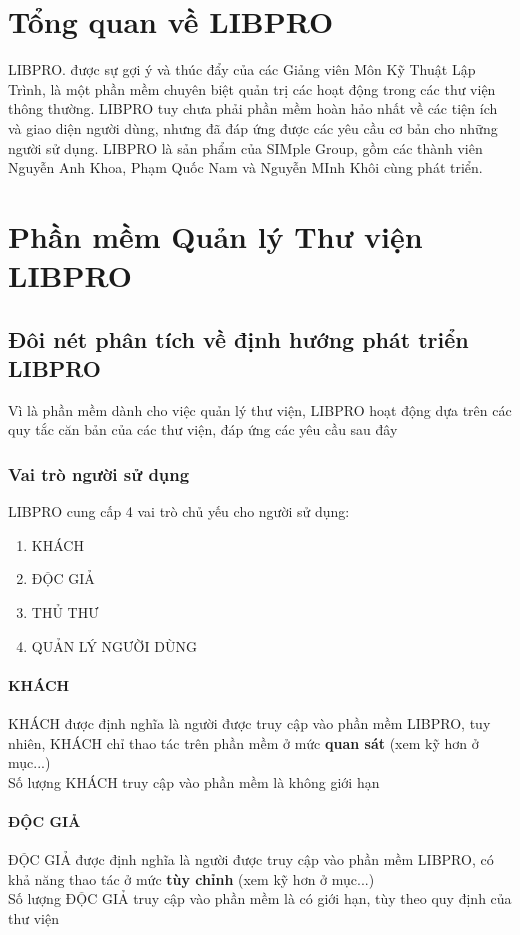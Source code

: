 \documentclass[12pt,a4paper]{report}
\begin{document}
\chapter{Tổng quan về LIBPRO}
LIBPRO. được sự gợi ý và thúc đẩy của các Giảng viên Môn Kỹ Thuật Lập Trình, là một phần mềm chuyên biệt quản trị các hoạt động trong các thư viện thông thường. LIBPRO tuy chưa phải phần mềm hoàn hảo nhất về các tiện ích và giao diện người dùng, nhưng đã đáp ứng được các yêu cầu cơ bản cho những người sử dụng. LIBPRO là sản phẩm của SIMple Group, gồm các thành viên Nguyễn Anh Khoa, Phạm Quốc Nam và Nguyễn MInh Khôi cùng phát triển.
\chapter{Phần mềm Quản lý Thư viện LIBPRO}
	\section{Đôi nét phân tích về định hướng phát triển LIBPRO}
	Vì là phần mềm dành cho việc quản lý thư viện, LIBPRO hoạt động dựa trên các quy tắc căn bản của các thư viện, đáp ứng các yêu cầu sau đây
		\subsection{Vai trò người sử dụng}
		LIBPRO cung cấp 4 vai trò chủ yếu cho người sử dụng:
		\begin{enumerate}
			\item KHÁCH
			\item ĐỘC GIẢ
			\item THỦ THƯ
			\item QUẢN LÝ NGƯỜI DÙNG
		\end{enumerate}
			\subsubsection{KHÁCH}
				KHÁCH được định nghĩa là người được truy cập vào phần mềm LIBPRO, tuy nhiên, KHÁCH chỉ thao tác trên phần mềm ở mức \textbf{quan sát} (xem kỹ hơn ở mục...)\\
				Số lượng KHÁCH truy cập vào phần mềm là không giới hạn
			\subsubsection{ĐỘC GIẢ}
				ĐỘC GIẢ được định nghĩa là người được truy cập vào phần mềm LIBPRO, có khả năng thao tác ở mức \textbf{tùy chỉnh} (xem kỹ hơn ở mục...) \\
				Số lượng ĐỘC GIẢ truy cập vào phần mềm là có giới hạn, tùy theo quy định của thư viện
\end{document}
